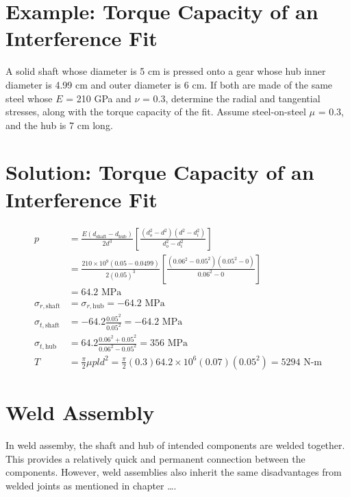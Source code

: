 \documentclass[a4paper,openany]{tufte-book}
\begin{document}
\section{Example: Torque Capacity of an Interference Fit}
\label{sec:orgd1cf16a}

A solid shaft whose diameter is 5 cm is pressed onto a gear whose hub inner diameter is 4.99 cm and outer diameter is 6 cm. If both are made of the same steel whose \(E\) = 210 GPa and \(\nu\) = 0.3, determine the radial and tangential stresses, along with the torque capacity of the fit. Assume steel-on-steel \(\mu\) = 0.3, and the hub is 7 cm long.

\section{Solution: Torque Capacity of an Interference Fit}
\label{sec:orgf034859}

\begin{align*}
  p &= \frac{E(d_{\text{shaft}} - d_{\text{hub}})}{2d^{3}} \left[ \frac{(d_{o}^{2} - d^{2})(d^{2} - d_{i}^{2})}{d_{o}^{2} - d_{i}^{2}} \right] \\
    &= \frac{210 \times 10^{9} (0.05 - 0.0499)}{2(0.05)^{3}} \left[ \frac{(0.06^{2} - 0.05^{2})(0.05^{2} - 0)}{0.06^{2} - 0} \right] \\
    &= 64.2 \text{ MPa} \\
  \sigma_{r,\text{shaft}} &= \sigma_{r,\text{hub}} = -64.2 \text{ MPa} \\
  \sigma_{t,\text{shaft}} &= -64.2 \frac{0.05^{2}}{0.05^{2}} = -64.2 \text{ MPa} \\
  \sigma_{t,\text{hub}} &= 64.2 \frac{0.06^{2} + 0.05^{2}}{0.06^{2} - 0.05^{2}} = 356 \text{ MPa} \\
  T &= \frac{\pi}{2}\mu pld^{2} = \frac{\pi}{2}(0.3) 64.2 \times 10^{6} (0.07)(0.05^{2}) = 5294 \text{ N-m}
\end{align*}


\section{Weld Assembly}
\label{sec:orgbf4af08}

In weld assemby, the shaft and hub of intended components are welded together. This provides a relatively quick and permanent connection between the components. However, weld assemblies also inherit the same disadvantages from welded joints as mentioned in chapter \ldots{}.
\end{document}
